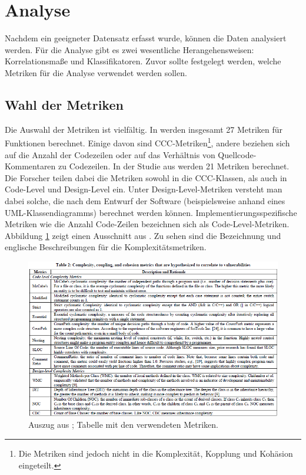 \section{Analyse}
\label{sec:analyse}
Nachdem ein geeigneter Datensatz erfasst wurde, können die Daten analysiert werden.
Für die Analyse gibt es zwei wesentliche Herangehensweisen: Korrelationsmaße und Klassifikatoren.
Zuvor sollte festgelegt werden, welche Metriken für die Analyse verwendet werden sollen.

\subsection{Wahl der Metriken}
Die Auswahl der Metriken ist vielfältig.
In \cite{alves_et_al} werden insgesamt 27 Metriken für Funktionen berechnet.
Einige davon sind CCC-Metriken\footnote{Die Metriken sind jedoch nicht in die Komplexität, Kopplung und Kohäsion eingeteilt.}, andere beziehen sich auf die Anzahl der Codezeilen oder auf das Verhältnis von Quellcode-Kommentaren zu Codezeilen.
In der Studie aus \cite{chowdhury_zulkernine_2009} werden 21 Metriken berechnet.
Die Forscher teilen dabei die Metriken sowohl in die CCC-Klassen, als auch in Code-Level und Design-Level ein.
Unter Design-Level-Metriken versteht man dabei solche, die nach dem Entwurf der Software (beispielsweise anhand eines UML-Klassendiagramms) berechnet werden können.
Implementierungsspezifische Metriken wie die Anzahl Code-Zeilen bezeichnen sich als Code-Level-Metriken.
Abbildung \ref{fig:chowdhury_metrics} zeigt einen Ausschnitt aus \cite{chowdhury_zulkernine_2010}.
Zu sehen sind die Bezeichnung und englische Beschreibungen für die Komplexitätsmetriken.
\begin{figure}
	\includegraphics[width=\textwidth]{img/chowdhury_metrics.png}
	\caption{Auszug aus \cite{chowdhury_zulkernine_2010}; Tabelle mit den verwendeten Metriken.}
	\label{fig:chowdhury_metrics}
\end{figure}

